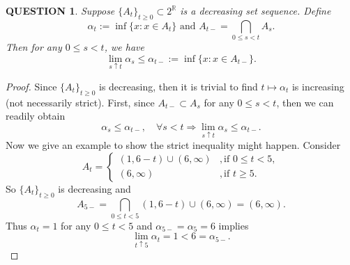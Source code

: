 \documentclass[12pt]{article}
\renewcommand{\(}{\left(}%
\renewcommand{\)}{\right)}%
\renewcommand{\[}{\left[}%
\renewcommand{\]}{\right]}%
\renewcommand{\r}{\mathbb{R}}
\newtheorem{question}{QUESTION}[section]}
\newtheorem{proof}{Proof.}}
\begin{document}
  \begin{question}
  	Suppose $\{A_t\}_{t\geq 0}\subset2^\r$ is a decreasing set sequence. Define 
  	\begin{equation*}
  		\alpha_t:=\inf\{x:x\in A_t\}\text{ and }A_{t-}=\bigcap_{0\leq s<t}A_s.
  	\end{equation*}
  	Then for any $0\leq s<t$, we have
  	\begin{equation*}
  		\lim_{s\uparrow t}\alpha_s \leq \alpha_{t-}:=\inf\{x:x\in A_{t-}\}.
  	\end{equation*}
  \end{question}
  \begin{proof}
  	Since $\{A_t\}_{t\geq 0}$ is decreasing, then it is trivial to find $t\mapsto \alpha_t$ is increasing (not necessarily strict). First, since $A_{t-}\subset A_s$ for any $0\leq s<t$, then we can readily obtain
  	\begin{equation*}
  		\alpha_s\leq \alpha_{t-},\quad \forall s<t\Longrightarrow \lim_{s\uparrow t}\alpha_s \leq \alpha_{t-}.
  	\end{equation*} 
  	Now we give an example to show the strict inequality might happen. Consider 
  	\begin{equation*}
  		A_t=
  		\begin{cases}
  			\(1,6-t\)\cup\(6,\infty\)&,\mbox{if }0\leq t<5, \\
  			\(6,\infty\)&,\mbox{if }t\geq 5.
  		\end{cases}
  	\end{equation*}
  	So $\{A_t\}_{t\geq 0}$ is decreasing and 
  	\begin{equation*}
  		A_{5-}=\bigcap_{0\leq t<5}\(1,6-t\)\cup\(6,\infty\)=  (6,\infty).
  	\end{equation*}
  	Thus $\alpha_t=1$ for any $0\leq t<5$ and $\alpha_{5-}=\alpha_5=6$ implies
  	\begin{equation*}
  		\lim_{t\uparrow 5}\alpha_t=1<6=\alpha_{5-}.
  	\end{equation*}
  \end{proof}
  
\end{document}
